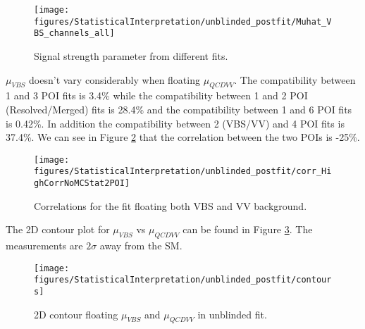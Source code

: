\begin{figure}[h]
  \centering
  \texttt{[image: figures/StatisticalInterpretation/unblinded\_postfit/Muhat\_VBS\_channels\_all]}
  \caption{Signal strength parameter from different fits.}
  \label{fig:fit:sigStrenghtCombine}
\end{figure}

$\mu_{VBS}$ doesn't vary considerably when floating $\mu_{QCDVV}$. The compatibility between 1 and 3 POI fits is 3.4\% while the compatibility between 1 and 2 POI (Resolved/Merged) fits is 28.4\% and the compatibility between 1 and 6 POI fits is 0.42\%. In addition the compatibility between 2 (VBS/VV) and 4 POI fits is 37.4\%. We can see in Figure \ref{fig:corr2POI} that the correlation between the two POIs is -25\%.

\begin{figure}[h]
  \centering
  \texttt{[image: figures/StatisticalInterpretation/unblinded\_postfit/corr\_HighCorrNoMCStat2POI]}
  \caption{Correlations for the fit floating both VBS and VV background.}
  \label{fig:corr2POI}
\end{figure}

The 2D contour plot for $\mu_{VBS}$ vs $\mu_{QCDVV}$ can be found in Figure \ref{fig:contour}. The measurements are $2\sigma$ away from the SM.

\begin{figure}[h]
  \centering
  \texttt{[image: figures/StatisticalInterpretation/unblinded\_postfit/contours]}
  \caption{2D contour floating $\mu_{VBS}$ and $\mu_{QCDVV}$ in unblinded fit.}
\label{fig:contour}
\end{figure}




